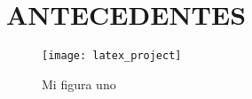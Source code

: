 \chapter{ANTECEDENTES}

\lipsum[1-1] \parencite{knuth:1984}

\begin{figure}[H]
    \centering
    \texttt{[image: latex\_project]}
    \caption{Mi figura uno}\label{fig:fig1}
\end{figure}